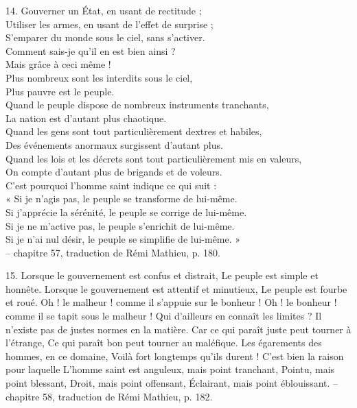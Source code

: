 \begin{singlequote}
    14.	Gouverner un État, en usant de rectitude ; \\Utiliser les armes, en usant de l’effet de surprise ;\\ S’emparer du monde sous le ciel, sans s’activer. \\Comment sais-je qu’il en est bien ainsi ?\\
Mais grâce à ceci même !\\
Plus nombreux sont les interdits sous le ciel, \\Plus pauvre est le peuple.\\
Quand le peuple dispose de nombreux instruments tranchants, \\La nation est d’autant plus chaotique.\\
 
Quand les gens sont tout particulièrement dextres et habiles, \\Des événements anormaux surgissent d’autant plus.\\
Quand les lois et les décrets sont tout particulièrement mis en valeurs, \\On compte d’autant plus de brigands et de voleurs.\\
C’est pourquoi l’homme saint indique ce qui suit :\\
« Si je n’agis pas, le peuple se transforme de lui-même.\\
Si j’apprécie la sérénité, le peuple se corrige de lui-même. \\Si je ne m’active pas, le peuple s’enrichit de lui-même.\\
Si je n’ai nul désir, le peuple se simplifie de lui-même. »\\
-- chapitre 57, traduction de Rémi Mathieu, p. 180.
\end{singlequote}

\begin{singlequote}
    15.	Lorsque le gouvernement est confus et distrait, Le peuple est simple et honnête.
Lorsque le gouvernement est attentif et minutieux, Le peuple est fourbe et roué.
Oh ! le malheur ! comme il s’appuie sur le bonheur ! Oh ! le bonheur ! comme il se tapit sous le malheur ! Qui d’ailleurs en connaît les limites ?
Il n’existe pas de justes normes en la matière. Car ce qui paraît juste peut tourner à l’étrange, Ce qui paraît bon peut tourner au maléfique. Les égarements des hommes, en ce domaine, Voilà fort longtemps qu’ils durent !
C’est bien la raison pour laquelle
L’homme saint est anguleux, mais point tranchant,
Pointu, mais point blessant, Droit, mais point offensant, Éclairant, mais point éblouissant.
-- chapitre 58, traduction de Rémi Mathieu, p. 182.
\end{singlequote}

